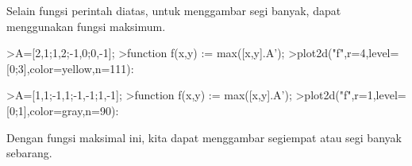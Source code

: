 \documentclass[a4paper,10pt]{article}
\begin{document}
\begin{eulernotebook}
\begin{eulercomment}
\begin{eulercomment}
\begin{eulercomment}
\begin{eulercomment}
\begin{eulercomment}
\begin{eulercomment}
\begin{eulercomment}
\begin{eulercomment}
\begin{eulercomment}
Selain fungsi perintah diatas, untuk menggambar segi banyak, dapat
menggunakan fungsi maksimum.
\end{eulercomment}
\begin{eulerprompt}
>A=[2,1;1,2;-1,0;0,-1];
>function f(x,y) := max([x,y].A');
>plot2d("f",r=4,level=[0;3],color=yellow,n=111):
\end{eulerprompt}
\begin{eulerprompt}
>A=[1,1;-1,1;-1,-1;1,-1];
>function f(x,y) := max([x,y].A');
>plot2d("f",r=1,level=[0;1],color=gray,n=90):
\end{eulerprompt}
\begin{eulercomment}
Dengan fungsi maksimal ini, kita dapat menggambar segiempat atau segi
banyak sebarang.



\end{eulercomment}
\end{eulercomment}
\end{eulercomment}
\end{eulercomment}
\end{eulercomment}
\end{eulercomment}
\end{eulercomment}
\end{eulercomment}
\end{eulercomment}
\end{eulernotebook}
\end{document}
